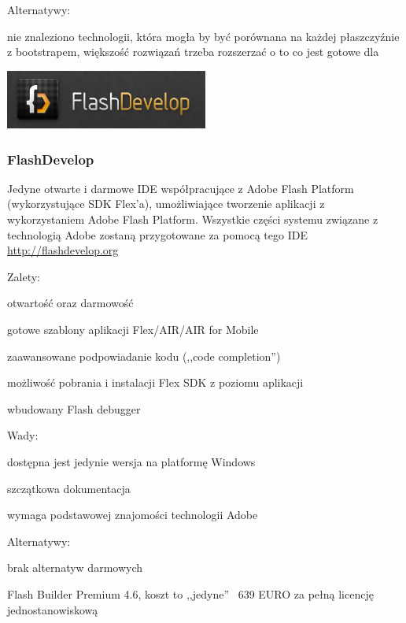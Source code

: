 \begin{minipage}{\textwidth}
    Alternatywy:
    \begin{packed_item}
        \item{nie znaleziono technologii, która mogła by być porównana na każdej płaszczyźnie z bootstrapem, większość rozwiązań trzeba rozszerzać o to co jest gotowe dla }
    \end{packed_item}
\end{minipage}


\begin{minipage}{\textwidth}
    \begin{center}
        \includegraphics[width=0.5\textwidth]{img/logos/flashdevelop.jpg}
    \end{center}
    \subsubsection{FlashDevelop}
    Jedyne otwarte i darmowe IDE współpracujące z Adobe Flash Platform (wykorzystujące SDK Flex'a), umożliwiające tworzenie aplikacji z wykorzystaniem Adobe Flash Platform. Wszystkie części systemu związane z technologią Adobe zostaną przygotowane za pomocą tego IDE \url{http://flashdevelop.org}
    
    Zalety:
    \begin{packed_item}
        \item{otwartość oraz darmowość}
        \item{gotowe szablony aplikacji Flex/AIR/AIR for Mobile}
        \item{zaawansowane podpowiadanie kodu (,,code completion'')}
        \item{możliwość pobrania i instalacji Flex SDK z poziomu aplikacji}
        \item{wbudowany Flash debugger}
    \end{packed_item}

    Wady:
    \begin{packed_item}
        \item{dostępna jest jedynie wersja na platformę Windows}
        \item{szczątkowa dokumentacja}
        \item{wymaga podstawowej znajomości technologii Adobe}
    \end{packed_item}

    Alternatywy:
    \begin{packed_item}
        \item{brak alternatyw darmowych}
        \item{Flash Builder Premium 4.6, koszt to ,,jedyne'' ~639 EURO za pełną licencję jednostanowiskową}
    \end{packed_item}
\end{minipage}


